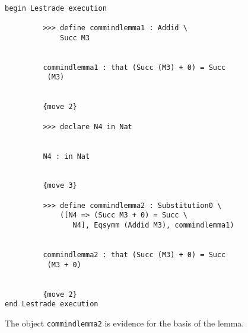\documentclass[12pt]{article}
\begin{document}
\begin{verbatim}

begin Lestrade execution

         >>> define commindlemma1 : Addid \
             Succ M3


         commindlemma1 : that (Succ (M3) + 0) = Succ 
          (M3)


         {move 2}

         >>> declare N4 in Nat


         N4 : in Nat


         {move 3}

         >>> define commindlemma2 : Substitution0 \
             ([N4 => (Succ M3 + 0) = Succ \
                N4], Eqsymm (Addid M3), commindlemma1)


         commindlemma2 : that (Succ (M3) + 0) = Succ 
          (M3 + 0)


         {move 2}
end Lestrade execution
\end{verbatim}

The object {\tt commindlemma2} is evidence for the basis of the lemma.
\end{document}
